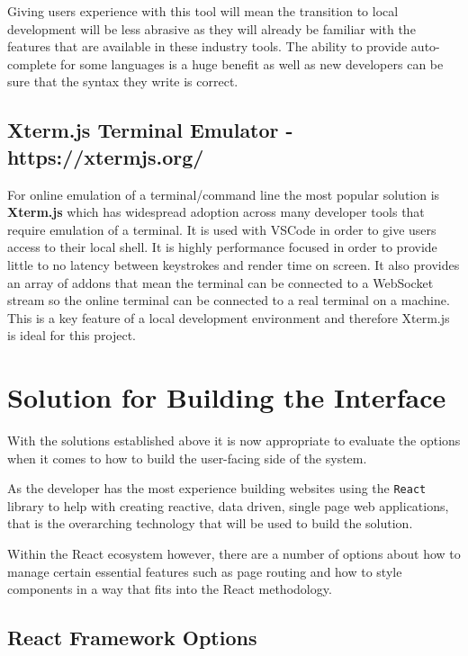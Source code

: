 Giving users experience with this tool will mean the transition to local development will be less abrasive as they will already be familiar with the features that are available in these industry tools. The ability to provide auto-complete for some languages is a huge benefit as well as new developers can be sure that the syntax they write is correct.

\subsection{Xterm.js Terminal Emulator - https://xtermjs.org/}

For online emulation of a terminal/command line the most popular solution is \textbf{Xterm.js} which has widespread adoption across many developer tools that require emulation of a terminal. It is used with VSCode in order to give users access to their local shell. It is highly performance focused in order to provide little to no latency between keystrokes and render time on screen. It also provides an array of addons that mean the terminal can be connected to a WebSocket stream so the online terminal can be connected to a real terminal on a machine. This is a key feature of a local development environment and therefore Xterm.js is ideal for this project.

\section{Solution for Building the Interface} \label{solapp-tools}

With the solutions established above it is now appropriate to evaluate the options when it comes to how to build the user-facing side of the system.

As the developer has the most experience building websites using the \texttt{React} library \cite{react} to help with creating reactive, data driven, single page web applications, that is the overarching technology that will be used to build the solution.

Within the React ecosystem however, there are a number of options about how to manage certain essential features such as page routing and how to style components in a way that fits into the React methodology.

\subsection{React Framework Options}

